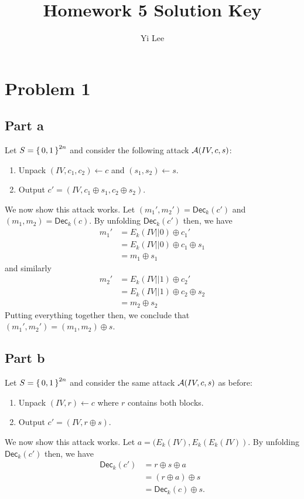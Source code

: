 \documentclass{article}
\title{Homework 5 Solution Key}
\author{Yi Lee}
\theoremstyle{definition}
\begin{document}


\maketitle

\section*{Problem 1}

\subsection*{Part a}

Let $S=\set{0, 1}^{2n}$ and consider the following attack $\mathcal{A}(IV, c, s)$:
\begin{enumerate}
    \item Unpack $(IV, c_1, c_2)\gets c$ and $(s_1, s_2)\gets s$.
    \item Output $c'=(IV, c_1\oplus s_1, c_2\oplus s_2)$.
\end{enumerate}
We now show this attack works.
Let $(m_1', m_2')=\mathsf{Dec}_k(c')$ and $(m_1, m_2)=\mathsf{Dec}_k(c)$.
By unfolding $\mathsf{Dec}_k(c')$ then, we have
\begin{align*}
    m_1'&=E_k(IV||0)\oplus c_1' \\
    &=E_k(IV||0)\oplus c_1\oplus s_1\\
    &=m_1\oplus s_1
\end{align*}
and similarly
\begin{align*}
    m_2'&=E_k(IV||1)\oplus c_2' \\
    &=E_k(IV||1)\oplus c_2\oplus s_2\\
    &=m_2\oplus s_2
\end{align*}
Putting everything together then, we conclude that $(m_1', m_2')=(m_1, m_2)\oplus s$.

\subsection*{Part b}

Let $S=\set{0, 1}^{2n}$ and consider the same attack $\mathcal{A}(IV, c, s)$ as before:
\begin{enumerate}
    \item Unpack $(IV, r)\gets c$ where $r$ contains both blocks.
    \item Output $c'=(IV, r\oplus s)$.
\end{enumerate}
We now show this attack works.
Let $a=(E_k(IV), E_k(E_k(IV))$.
By unfolding $\mathsf{Dec}_k(c')$ then, we have
\begin{align*}
    \mathsf{Dec}_k(c')&=r\oplus s\oplus a \\
    &=(r\oplus a) \oplus s \\
    &=\mathsf{Dec}_k(c)\oplus s.
\end{align*}
\end{document}
